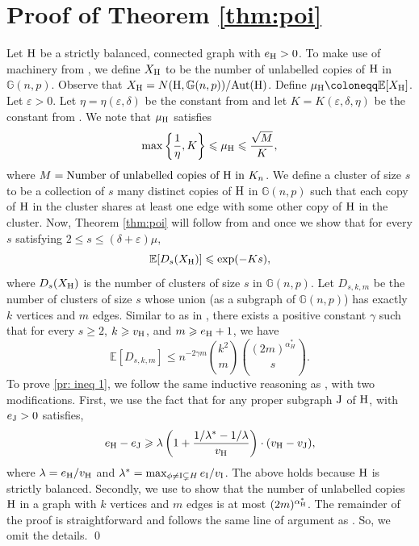 \documentclass[a4paper,11pt,english,reqno]{amsart}
\numberwithin{equation}{section}
\renewcommand{\leq}{\leqslant}
\renewcommand{\geq}{\geqslant}
\newcommand{\E}{\mathbb{E}}
\newcommand{\uH}{\textup{H}}
\newcommand{\G}{\mathbb{G}}
\newcommand{\tu}[1]{\textup{#1}}
\begin{document}
\section{Proof of Theorem \ref{thm:poi}}


Let $\uH$ be a strictly balanced, connected graph with $e_{\uH}>0$. To make use of machinery from \cite{HMS}, we define $X_{\uH}$ to be the number of unlabelled copies of $\uH$ in $\G(n,p)$. Observe that $X_{\uH} = N(\uH, \G(n,p))/\tu{Aut}(\uH)$. Define $\mu_{\uH} \coloneqq \E[X_{\uH}]$. Let $\varepsilon>0$. Let $\eta = \eta(\varepsilon, \delta)$ be the constant from {\cite[Proposition~8.3]{HMS}} and let $K=K(\varepsilon, \delta, \eta)$ be the constant from {\cite[Lemma~8.5]{HMS}}. We note that $\mu_{\uH}$ satisfies \begin{equation*}
	\max\left\{\frac{1}{\eta}, K\right\}\leq \mu_{\uH} \leq \frac{\sqrt{M}}{K}, 
\end{equation*}
where $M= \text{Number of unlabelled copies of 
}\uH\text{ in }K_{n}$. We define a cluster of size $s$ to be a collection of $s$ many distinct copies of $\uH$ in $\G(n,p)$ such that each copy of $\uH$ in the cluster shares at least one edge with some other copy of $\uH$ in the cluster. Now, Theorem \ref{thm:poi} will follow from {\cite[Proposition~8.3]{HMS}} and {\cite[Lemma~8.5]{HMS}} once we show that for every $s$ satisfying $2\leq s\leq (\delta+\varepsilon)\mu,
$\begin{equation*}
	\E[D_s(X_{\uH})]\leq \exp(-Ks),
\end{equation*}
where $D_{s}(X_{\uH})$ is the number of clusters of size $s$ in $\G(n,p)$. Let $D_{s,k,m}$ be the number of clusters of size $s$ whose union (as a subgraph of $\G(n,p)$) has exactly $k$ vertices and $m$ edges. Similar to as in {\cite[Claim~8.7]{HMS}}, there exists a positive constant $\gamma$ such that for every $s\geq 2$, $k\geq v_{\uH}$, and $m\geq e_{\uH}+1$, we have
\begin{equation}
	\label{pr: ineq 1}
	\E[D_{s,k,m}]\leq n^{-2\gamma m}{k^{2} \choose m}{(2m)^{\alpha^{*}_{H}}\choose s}.
\end{equation}
To prove \eqref{pr: ineq 1}, we follow the same inductive reasoning as \cite{HMS}, with two modifications. First, we use the fact that for any proper subgraph $\tu{J}$ of $\uH$, with $e_{\tu{J}}>0$ satisfies,
\begin{equation*}
	e_{\uH}-e_{\tu{J}}\geq \lambda\left(1+\frac{1/\lambda^{*} - 1/\lambda}{v_{\uH}}\right)\cdot (v_{\uH}-v_{\tu{J}}),
\end{equation*}
where $\lambda = e_{\uH}/v_{\uH}$ and $\lambda^{*} = \max_{\phi\neq \tu{I}\subsetneq H} e_{\tu{I}}/{v_{\tu{I}}}$. The above holds because $\uH$ is strictly balanced. Secondly, we use {\cite[Theorem~5.7]{HMS}} to show that the number of unlabelled copies $\uH$ in a graph with $k$ vertices and $m$ edges is at most $(2m)^{\alpha^{*}_{\uH}}$. The remainder of the proof is straightforward and follows the same line of argument as \cite{HMS}. So, we omit the details.
\qed
\end{document}
